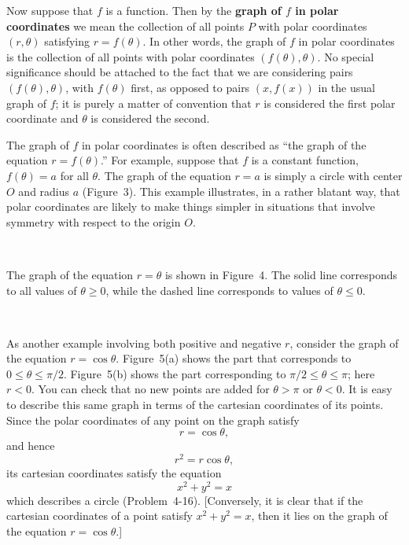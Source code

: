 Now suppose that $f$ is a function. Then by the \textbf{graph of $f$ in polar
coordinates} we mean the collection of all points $P$ with polar coordinates
$(r,\theta)$ satisfying $r=f(\theta)$. In other words, the graph of $f$ in
polar coordinates is the collection of all points with polar coordinates
$(f(\theta),\theta)$. No special significance should be attached to the fact
that we are considering pairs $(f(\theta),\theta)$, with $f(\theta)$ first, as
opposed to pairs $(x,f(x))$ in the usual graph of $f$; it is purely a matter of
convention that $r$ is considered the first polar coordinate and $\theta$ is
considered the second.

The graph of $f$ in polar coordinates is often described as ``the graph of the
equation $r=f(\theta)$.'' For example, suppose that $f$ is a constant function,
$f(\theta)=a$ for all $\theta$. The graph of the equation $r=a$ is simply a
circle with center $O$ and radius $a$ (Figure~3). This example illustrates, in
a rather blatant way, that polar coordinates are likely to make things simpler
in situations that involve symmetry with respect to the origin $O$.

\begin{center}
\\[0.6em]
\end{center}

The graph of the equation $r=\theta$ is shown in Figure~4. The solid line
corresponds to all values of $\theta\geq 0$, while the dashed line corresponds
to values of $\theta\leq 0$.

\begin{center}
\\[0.6em]
\end{center}

As another example involving both positive and negative $r$, consider the graph
of the equation $r=\cos\theta$. Figure~5(a) shows the part that corresponds to
$0\leq\theta\leq\pi/2$. Figure~5(b) shows the part corresponding to
$\pi/2\leq\theta\leq\pi$; here $r<0$. You can check that no new points are added
for $\theta>\pi$ or $\theta<0$. It is easy to describe this same graph in terms
of the cartesian coordinates of its points. Since the polar coordinates of any
point on the graph satisfy
\[
r=\cos\theta,
\]
and hence
\[
r^2=r\cos\theta,
\]
its cartesian coordinates satisfy the equation
\[
x^2+y^2=x
\]
which describes a circle (Problem~4-16). [Conversely, it is clear that if the
cartesian coordinates of a point satisfy $x^2+y^2=x$, then it lies on the graph
of the equation $r=\cos\theta$.]

